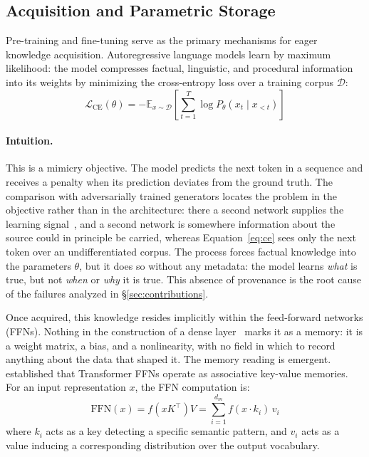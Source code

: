 \documentclass[10pt]{article}
\begin{document}
\subsection{Acquisition and Parametric Storage}
\label{sec:acquisition}
\label{sec:storage}

Pre-training and fine-tuning serve as the primary mechanisms for eager knowledge acquisition. Autoregressive language models learn by maximum likelihood: the model compresses factual, linguistic, and procedural information into its weights by minimizing the cross-entropy loss over a training corpus $\mathcal{D}$:
\begin{equation}
  \label{eq:ce}
  \mathcal{L}_{\text{CE}}(\theta) = -\mathbb{E}_{x \sim \mathcal{D}} \left[ \sum_{t=1}^T \log P_\theta(x_t \mid x_{<t}) \right]
\end{equation}

\paragraph{Intuition.} This is a mimicry objective. The model predicts the next token in a sequence and receives a penalty when its prediction deviates from the ground truth. The comparison with adversarially trained generators locates the problem in the objective rather than in the architecture: there a second network supplies the learning signal~\citep{thakur2021gan}, and a second network is somewhere information about the source could in principle be carried, whereas Equation~\ref{eq:ce} sees only the next token over an undifferentiated corpus. The process forces factual knowledge into the parameters $\theta$, but it does so without any metadata: the model learns \textit{what} is true, but not \textit{when} or \textit{why} it is true. This absence of provenance is the root cause of the failures analyzed in \S\ref{sec:contributions}.

Once acquired, this knowledge resides implicitly within the feed-forward networks (FFNs). Nothing in the construction of a dense layer~\citep{thakur2021fundamentals} marks it as a memory: it is a weight matrix, a bias, and a nonlinearity, with no field in which to record anything about the data that shaped it. The memory reading is emergent. \citet{geva2021kv} established that Transformer FFNs operate as associative key-value memories. For an input representation $x$, the FFN computation is:
\begin{equation}
  \label{eq:ffn}
  \text{FFN}(x) = f(x K^\top)V = \sum_{i=1}^{d_m} f(x \cdot k_i)\, v_i
\end{equation}
where $k_i$ acts as a key detecting a specific semantic pattern, and $v_i$ acts as a value inducing a corresponding distribution over the output vocabulary.
\end{document}
